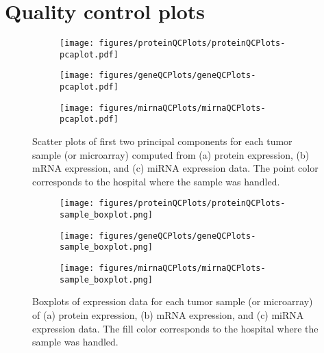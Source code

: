 


\section{Quality control plots\label{app:qc-plots}}


\begin{figure}[!h]
	\centering
	\begin{subfigure}{.7\textwidth}
		\centering
		\texttt{[image: figures/proteinQCPlots/proteinQCPlots-pcaplot.pdf]}
	\end{subfigure}
	\begin{subfigure}{.48\textwidth}
		\centering
		\texttt{[image: figures/geneQCPlots/geneQCPlots-pcaplot.pdf]}
	\end{subfigure}
	\begin{subfigure}{.48\textwidth}
		\centering
		\texttt{[image: figures/mirnaQCPlots/mirnaQCPlots-pcaplot.pdf]}
	\end{subfigure}%
	\caption{Scatter plots of first two principal components for each tumor sample (or microarray)
	computed from (a) protein expression, (b) mRNA expression, and (c) miRNA expression data.
	The point color corresponds to the hospital where the sample was handled.}
	\label{fig:qc-pca}
\end{figure}


\begin{figure}
	\centering
	\begin{subfigure}{1\textwidth}
		\centering
		\texttt{[image: figures/proteinQCPlots/proteinQCPlots-sample\_boxplot.png]}
	\end{subfigure}
	\begin{subfigure}{1\textwidth}
		\centering
		\texttt{[image: figures/geneQCPlots/geneQCPlots-sample\_boxplot.png]}
	\end{subfigure}
	\begin{subfigure}{1\textwidth}
		\centering
		\texttt{[image: figures/mirnaQCPlots/mirnaQCPlots-sample\_boxplot.png]}
	\end{subfigure}%
	\caption{Boxplots of expression data for each tumor sample (or microarray) of
	(a) protein expression, (b) mRNA expression, and (c) miRNA expression data. 
	The fill color corresponds to the hospital where the sample was handled.}
	\label{fig:qc-sample-boxplot}
\end{figure}


